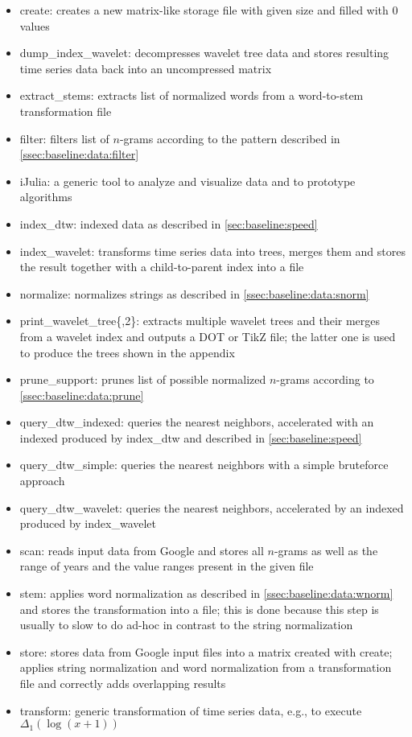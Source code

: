 \begin{itemize}
    \item create: creates a new matrix-like storage file with given size and filled with $0$ values
    \item dump\_index\_wavelet: decompresses wavelet tree data and stores resulting time series data back into an uncompressed matrix
    \item extract\_stems: extracts list of normalized words from a word-to-stem transformation file
    \item filter: filters list of $n$-grams according to the pattern described in \autoref{ssec:baseline:data:filter}
    \item iJulia: a generic tool to analyze and visualize data and to prototype algorithms
    \item index\_dtw: indexed data as described in \autoref{sec:baseline:speed}
    \item index\_wavelet: transforms time series data into trees, merges them and stores the result together with a child-to-parent index into a file
    \item normalize: normalizes strings as described in \autoref{ssec:baseline:data:snorm}
    \item print\_wavelet\_tree\{,2\}: extracts multiple wavelet trees and their merges from a wavelet index and outputs a DOT or TikZ file; the latter one is used to produce the trees shown in the appendix
    \item prune\_support: prunes list of possible normalized $n$-grams according to \autoref{ssec:baseline:data:prune}
    \item query\_dtw\_indexed: queries the nearest neighbors, accelerated with an indexed produced by index\_dtw and described in \autoref{sec:baseline:speed}
    \item query\_dtw\_simple: queries the nearest neighbors with a simple bruteforce approach
    \item query\_dtw\_wavelet: queries the nearest neighbors, accelerated by an indexed produced by index\_wavelet
    \item scan: reads input data from Google and stores all $n$-grams as well as the range of years and the value ranges present in the given file
    \item stem: applies word normalization as described in \autoref{ssec:baseline:data:wnorm} and stores the transformation into a file; this is done because this step is usually to slow to do ad-hoc in contrast to the string normalization
    \item store: stores data from Google input files into a matrix created with create; applies string normalization and word normalization from a transformation file and correctly adds overlapping results
    \item transform: generic transformation of time series data, e.g., to execute $\Delta_1(\log(x + 1))$
\end{itemize}

